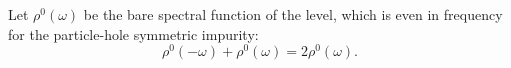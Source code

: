 \documentclass{article}
\begin{document}
Let $\rho^{0}(\omega)$ be the bare spectral function of the level, which is even in frequency
for the particle-hole symmetric impurity:
\begin{equation}
\rho^{0}(-\omega) + \rho^{0}(\omega) = 2\rho^{0}(\omega) .
\label{eq:even}
\end{equation}
\end{document}
